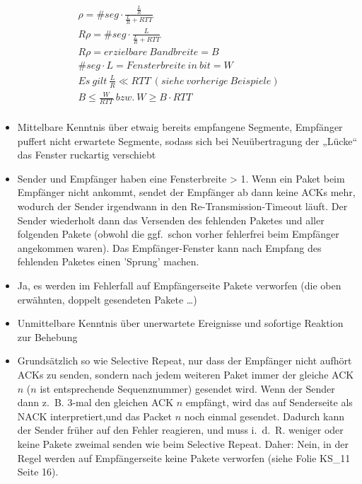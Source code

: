 \begin{gather*}
    \rho = \#seg \cdot \frac{\frac{L}{R}}{\frac{L}{R} + RTT}\\
    R\rho = \#seg \cdot \frac{L}{\frac{L}{R} + RTT}\\
    R\rho = erzielbare \ Bandbreite = B\\
    \#seg \cdot L = Fensterbreite \ in \ bit = W\\
    Es \ gilt \ \frac{L}{R} \ll RTT \ (siehe \ vorherige \ Beispiele)\\
    B \leq \frac{W}{RTT} \ bzw.\ W \geq B \cdot RTT\\
\end{gather*}

\begin{itemize}
    \item Mittelbare Kenntnis über etwaig bereits empfangene Segmente, Empfänger puffert nicht erwartete Segmente, sodass sich bei Neuübertragung der „Lücke“ das Fenster ruckartig verschiebt
    \item Sender und Empfänger haben eine Fensterbreite > 1.
    Wenn ein Paket beim Empfänger nicht ankommt, sendet der Empfänger ab dann keine ACKs mehr, wodurch der Sender irgendwann in den Re-Transmission-Timeout läuft.
    Der Sender wiederholt dann das Versenden des fehlenden Paketes und aller folgenden Pakete (obwohl die ggf.\ schon vorher fehlerfrei beim Empfänger angekommen waren).
    Das Empfänger-Fenster kann nach Empfang des fehlenden Paketes einen 'Sprung' machen.
    \item Ja, es werden im Fehlerfall auf Empfängerseite Pakete verworfen (die oben erwähnten, doppelt gesendeten Pakete \ldots)
\end{itemize}

\begin{itemize}
    \item Unmittelbare Kenntnis über unerwartete Ereignisse und sofortige Reaktion zur Behebung
    \item Grundsätzlich so wie Selective Repeat, nur dass der Empfänger nicht aufhört ACKs zu senden, sondern nach jedem weiteren Paket immer der gleiche ACK $n$ ($n$ ist entsprechende Sequenznummer) gesendet wird.
    Wenn der Sender dann z.\ B. 3-mal den gleichen ACK $n$ empfängt, wird das auf Senderseite als NACK interpretiert,und das Packet $n$ noch einmal gesendet.
    Dadurch kann der Sender früher auf den Fehler reagieren, und muss i.\ d.\ R. weniger oder keine Pakete zweimal senden wie beim Selective Repeat.
    Daher: Nein, in der Regel werden auf Empfängerseite keine Pakete verworfen (siehe Folie KS\_11 Seite 16).
\end{itemize}


